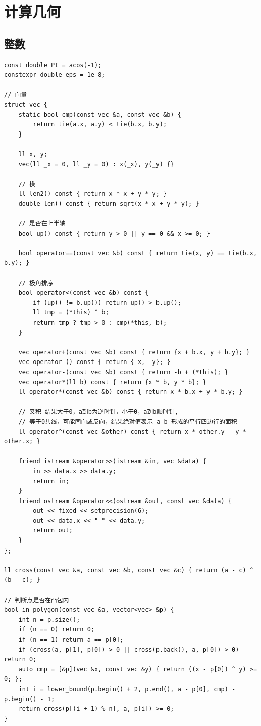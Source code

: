 \documentclass[UTF8]{ctexart}
\begin{document}
\begin{sloppypar}
\clearpage

\section{计算几何}

\subsection{整数}
\begin{lstlisting}[style=cpp]
const double PI = acos(-1);
constexpr double eps = 1e-8;

// 向量
struct vec {
    static bool cmp(const vec &a, const vec &b) {
        return tie(a.x, a.y) < tie(b.x, b.y);
    }

    ll x, y;
    vec(ll _x = 0, ll _y = 0) : x(_x), y(_y) {}

    // 模
    ll len2() const { return x * x + y * y; }
    double len() const { return sqrt(x * x + y * y); }

    // 是否在上半轴
    bool up() const { return y > 0 || y == 0 && x >= 0; }

    bool operator==(const vec &b) const { return tie(x, y) == tie(b.x, b.y); }

    // 极角排序
    bool operator<(const vec &b) const {
        if (up() != b.up()) return up() > b.up();
        ll tmp = (*this) ^ b;
        return tmp ? tmp > 0 : cmp(*this, b);
    }

    vec operator+(const vec &b) const { return {x + b.x, y + b.y}; }
    vec operator-() const { return {-x, -y}; }
    vec operator-(const vec &b) const { return -b + (*this); }
    vec operator*(ll b) const { return {x * b, y * b}; }
    ll operator*(const vec &b) const { return x * b.x + y * b.y; }

    // 叉积 结果大于0，a到b为逆时针，小于0，a到b顺时针,
    // 等于0共线，可能同向或反向，结果绝对值表示 a b 形成的平行四边行的面积
    ll operator^(const vec &other) const { return x * other.y - y * other.x; }

    friend istream &operator>>(istream &in, vec &data) {
        in >> data.x >> data.y;
        return in;
    }
    friend ostream &operator<<(ostream &out, const vec &data) {
        out << fixed << setprecision(6);
        out << data.x << " " << data.y;
        return out;
    }
};

ll cross(const vec &a, const vec &b, const vec &c) { return (a - c) ^ (b - c); }

// 判断点是否在凸包内
bool in_polygon(const vec &a, vector<vec> &p) {
    int n = p.size();
    if (n == 0) return 0;
    if (n == 1) return a == p[0];
    if (cross(a, p[1], p[0]) > 0 || cross(p.back(), a, p[0]) > 0) return 0;
    auto cmp = [&p](vec &x, const vec &y) { return ((x - p[0]) ^ y) >= 0; };
    int i = lower_bound(p.begin() + 2, p.end(), a - p[0], cmp) - p.begin() - 1;
    return cross(p[(i + 1) % n], a, p[i]) >= 0;
}


\end{lstlisting}
\end{sloppypar}
\end{document}
